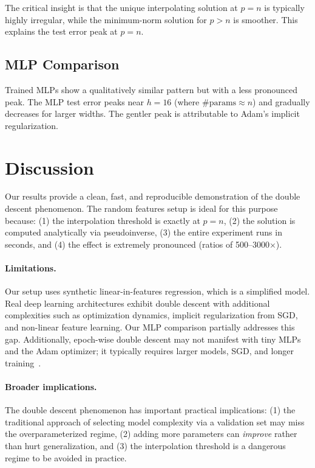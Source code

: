 \documentclass[11pt]{article}
\begin{document}
The critical insight is that the unique interpolating solution at $p = n$ is typically highly irregular, while the minimum-norm solution for $p > n$ is smoother. This explains the test error peak at $p = n$.

\subsection{MLP Comparison}

Trained MLPs show a qualitatively similar pattern but with a less pronounced peak. The MLP test error peaks near $h = 16$ (where $\#\text{params} \approx n$) and gradually decreases for larger widths. The gentler peak is attributable to Adam's implicit regularization.

\section{Discussion}

Our results provide a clean, fast, and reproducible demonstration of the double descent phenomenon. The random features setup is ideal for this purpose because: (1) the interpolation threshold is exactly at $p = n$, (2) the solution is computed analytically via pseudoinverse, (3) the entire experiment runs in seconds, and (4) the effect is extremely pronounced (ratios of 500--3000$\times$).

\paragraph{Limitations.} Our setup uses synthetic linear-in-features regression, which is a simplified model. Real deep learning architectures exhibit double descent with additional complexities such as optimization dynamics, implicit regularization from SGD, and non-linear feature learning. Our MLP comparison partially addresses this gap. Additionally, epoch-wise double descent may not manifest with tiny MLPs and the Adam optimizer; it typically requires larger models, SGD, and longer training~\citep{nakkiran2019deep}.

\paragraph{Broader implications.} The double descent phenomenon has important practical implications: (1) the traditional approach of selecting model complexity via a validation set may miss the overparameterized regime, (2) adding more parameters can \emph{improve} rather than hurt generalization, and (3) the interpolation threshold is a dangerous regime to be avoided in practice.
\end{document}
